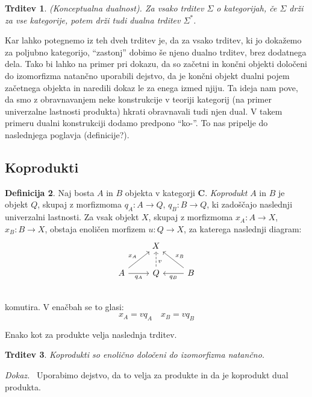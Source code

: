 \documentclass[12pt,a4paper]{book}
\theoremstyle{definition}
\newtheorem{definicija}{Definicija}[chapter]
\theoremstyle{plain}
\newtheorem{trditev}[definicija]{Trditev}
\newenvironment{dokaz}{\emph{Dokaz.}\ }{\hspace{\fill}{$\Box$}}
\theoremstyle{definition}
\theoremstyle{remark}
\newcommand{\cat}[1]{\textbf{#1}}
\begin{document}
\begin{trditev} \emph{(Konceptualna dualnost)}.
Za vsako trditev $\Sigma$ o kategorijah, če $\Sigma$ drži za vse kategorije, potem drži tudi dualna trditev $\Sigma^*$.
\end{trditev}

Kar lahko potegnemo iz teh dveh trditev je, da za vsako trditev, ki jo dokažemo za poljubno kategorijo, "`zastonj"' dobimo še njeno dualno trditev, brez dodatnega dela. Tako bi lahko na primer pri dokazu, da so začetni in končni objekti določeni do izomorfizma natančno uporabili dejstvo, da je končni objekt dualni pojem začetnega objekta in naredili dokaz le za enega izmed njiju.
Ta ideja nam pove, da smo z obravnavanjem neke konstrukcije v teoriji kategorij (na primer univerzalne lastnosti produkta) hkrati obravnavali tudi njen dual. V takem primeru dualni konstrukciji dodamo predpono "`ko-"'. To nas pripelje do naslednjega poglavja (definicije?).

\subsection{Koprodukti}
\begin{definicija}
Naj bosta $A$ in $B$ objekta v kategorji $\cat{C}$. \emph{Koprodukt} $A$ in $B$ je objekt $Q$, skupaj z morfizmoma $q_A : A \to Q$, $q_B : B \to Q$, ki zadoščajo naslednji univerzalni lastnosti. Za vsak objekt $X$, skupaj z morfizmoma $x_A : A \to X$, $x_B : B \to X$, obstaja enoličen morfizem $u : Q \to X$, za katerega naslednji diagram:
%
$$\begin{tikzcd}
& X & \\
A \ar[ur, "x_A"] \ar[r, "q_A"'] & Q \ar[u, dashed, pos=0.35, "v"']  & B \ar[l, "q_B"] \ar[ul, "x_B"'] \\
\end{tikzcd}$$
komutira. V enačbah se to glasi:
$$x_A = v q_A \quad x_B = v q_B$$
\end{definicija}
Enako kot za produkte velja naslednja trditev.
\begin{trditev}
Koprodukti so enolično določeni do izomorfizma natančno.
\end{trditev}
\begin{dokaz}
Uporabimo dejstvo, da to velja za produkte in da je koprodukt dual produkta.
\end{dokaz}
\end{document}
